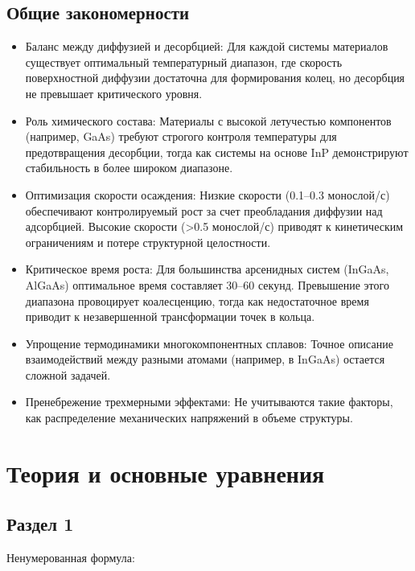 \documentclass[14pt,oneside]{extarticle}
\begin{document}
\subsection{Общие закономерности}

\begin{itemize}
    \item Баланс между диффузией и десорбцией: Для каждой системы материалов существует оптимальный температурный диапазон, где скорость поверхностной диффузии достаточна для формирования колец, но десорбция не превышает критического уровня.
    \item Роль химического состава: Материалы с высокой летучестью компонентов (например, GaAs) требуют строгого контроля температуры для предотвращения десорбции, тогда как системы на основе InP демонстрируют стабильность в более широком диапазоне.
    \item Оптимизация скорости осаждения: Низкие скорости (0.1–0.3 монослой/с) обеспечивают контролируемый рост за счет преобладания диффузии над адсорбцией. Высокие скорости (>0.5 монослой/с) приводят к кинетическим ограничениям и потере структурной целостности.
    \item Критическое время роста: Для большинства арсенидных систем (InGaAs, AlGaAs) оптимальное время составляет 30–60 секунд. Превышение этого диапазона провоцирует коалесценцию, тогда как недостаточное время приводит к незавершенной трансформации точек в кольца.
    \item Упрощение термодинамики многокомпонентных сплавов: Точное описание взаимодействий между разными атомами (например, в InGaAs) остается сложной задачей.
    \item Пренебрежение трехмерными эффектами: Не учитываются такие факторы, как распределение механических напряжений в объеме структуры.
\end{itemize}

\pagebreak
\section{Теория и основные уравнения}

\subsection{Раздел 1}

Ненумерованная формула:
\end{document}
